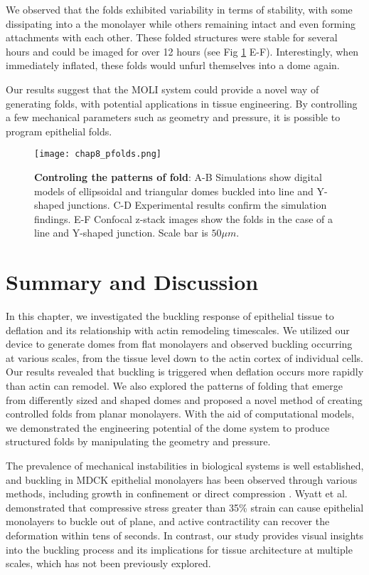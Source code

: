 We observed that the folds exhibited variability in terms of stability, with some dissipating into a the monolayer while others remaining intact and even forming attachments with each other.  These folded structures were stable for several hours and could be imaged for over 12 hours (see Fig \ref{fig_8_7} E-F). Interestingly, when immediately inflated, these folds would unfurl themselves into a dome again.

Our results suggest that the MOLI system could provide a novel way of generating folds, with potential applications in tissue engineering. By controlling a few mechanical parameters such as geometry and pressure, it is possible to program epithelial folds.

\begin{figure}
	\centering
	\texttt{[image: chap8\_pfolds.png]}
	\caption{\label{fig_8_7} \textbf{Controling the patterns of fold}: A-B Simulations show digital models of ellipsoidal and triangular domes buckled into line and Y-shaped junctions. C-D Experimental results confirm the simulation findings. E-F Confocal z-stack images show the folds in the case of a line and Y-shaped junction. Scale bar is $50\mu m$.	}
\end{figure}


\newpage

\hypertarget{summary-and-discussion-1}{%
	\section{Summary and Discussion}\label{summary-and-discussion-1}}

In this chapter, we investigated the buckling response of epithelial tissue to deflation and its relationship with actin remodeling timescales. We utilized our device to generate domes from flat monolayers and observed buckling occurring at various scales, from the tissue level down to the actin cortex of individual cells. Our results revealed that buckling is triggered when deflation occurs more rapidly than actin can remodel. We also explored the patterns of folding that emerge from differently sized and shaped domes and proposed a novel method of creating controlled folds from planar monolayers. With the aid of computational models, we demonstrated the engineering potential of the dome system to produce structured folds by manipulating the geometry and pressure.

The prevalence of mechanical instabilities in biological systems is well established, and buckling in MDCK epithelial monolayers has been observed through various methods, including growth in confinement or direct compression \cite{wyatt2020,trushko2020}. Wyatt et al. demonstrated that compressive stress greater than 35\% strain can cause epithelial monolayers to buckle out of plane, and active contractility can recover the deformation within tens of seconds. In contrast, our study provides visual insights into the buckling process and its implications for tissue architecture at multiple scales, which has not been previously explored.

